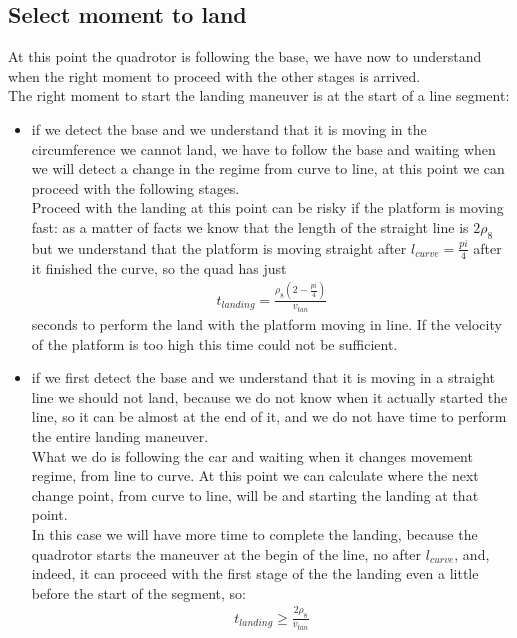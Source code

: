 \subsection{Select moment to land}
At this point the quadrotor is following the base, we have now to understand when the right moment to proceed with the other stages is arrived.\\
The right moment to start the landing maneuver is at the start of a line segment:
\begin{itemize}
\item if we detect the base and we understand that it is moving in the circumference we cannot land, we have to follow the base and waiting when we will detect a change in the regime from curve to line, at this point we can proceed with the following stages.\\
Proceed with the landing at this point can be risky if the platform is moving fast: as a matter of facts we know that the length of the straight line is $2\rho_8$ but we understand that the platform is moving straight after $l_{curve} = \frac{pi}{4}$ after it finished the curve, so the quad has just 
\begin{align*}
t_{landing} = \frac{\rho_8(2-\frac{pi}{4})}{v_{tan}}
\end{align*}
seconds to perform the land with the platform moving in line. If the velocity of the platform is too high this time could not be sufficient.
\item if we first detect the base and we understand that it is moving in a straight line we should not land, because we do not know when it actually started the line, so it can be almost at the end of it, and we do not have time to perform the entire landing maneuver.\\
What we do is following the car and waiting when it changes movement regime, from line to curve. At this point we can calculate where the next change point, from curve to line, will be and starting the landing at that point.\\
In this case we will have more time to complete the landing, because the quadrotor starts the maneuver at the begin of the line, no after $l_{curve}$, and, indeed, it can proceed with the first stage of the the landing even a little before the start of the segment, so:
\begin{align*}
t_{landing} \geq \frac{2\rho_8}{v_{tan}}
\end{align*}


\end{itemize}
